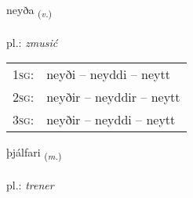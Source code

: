 \documentclass[frontgrid, backgrid]{flacards}\usepackage[]{graphicx}\usepackage[]{xcolor}
\begin{document}
\renewcommand{\flhead}{\vskip5pt \fboxsep=0pt {\small\bfseries\footnotesize Sagnorð | czasownik}}
\renewcommand{\fcfoot}{\vskip5pt \fboxsep=0pt \hspace{2pt}{\small\bfseries\footnotesize 3K}}

\renewcommand{\blhead}{\vskip5pt {\small\bfseries\footnotesize Sagnorð | czasownik }}
\renewcommand{\bcfoot}{\vskip5pt \hspace{2pt}{\small\bfseries\footnotesize 3K}}


{neyða \small{\textsubscript{(\textit{v.})}} \\[1ex] %
\textphonetic{[neiːða]} \\
pl.: \emph{zmusić} \\  [2ex]
\renewcommand*{\arraystretch}{0.8}
\begin{tabular}{p{1cm}l}
\textsc{1sg}: & neyði -- neyddi -- neytt \\ 
\textsc{2sg}: & neyðir -- neyddir -- neytt \\ 
\textsc{3sg}: & neyðir -- neyddi -- neytt \\ 
\end{tabular}
}

\renewcommand{\flhead}{\vskip5pt \fboxsep=0pt {\small\bfseries\footnotesize Nafnorð | rzeczownik}}
\renewcommand{\fcfoot}{\vskip5pt \fboxsep=0pt \hspace{2pt}{\small\bfseries\footnotesize 3K}}

\renewcommand{\blhead}{\vskip5pt {\small\bfseries\footnotesize Nafnorð | rzeczownik }}
\renewcommand{\bcfoot}{\vskip5pt \hspace{2pt}{\small\bfseries\footnotesize 3K}}


{þjálfari \small{\textsubscript{(\textit{m.})}} \\[1ex] %
\textphonetic{[θjaulvarɪ]} \\
pl.: \emph{trener} \\  [2ex]
\renewcommand*{\arraystretch}{0.8}
}
\end{document}
